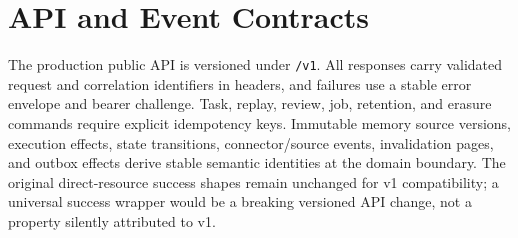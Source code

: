 \documentclass[10pt]{article}
\newcommand{\code}[1]{\texttt{#1}}
\begin{document}
\section{API and Event Contracts}

The production public API is versioned under \code{/v1}. All responses carry validated request and correlation identifiers in headers, and failures use a stable error envelope and bearer challenge. Task, replay, review, job, retention, and erasure commands require explicit idempotency keys. Immutable memory source versions, execution effects, state transitions, connector/source events, invalidation pages, and outbox effects derive stable semantic identities at the domain boundary. The original direct-resource success shapes remain unchanged for v1 compatibility; a universal success wrapper would be a breaking versioned API change, not a property silently attributed to v1.
\end{document}
